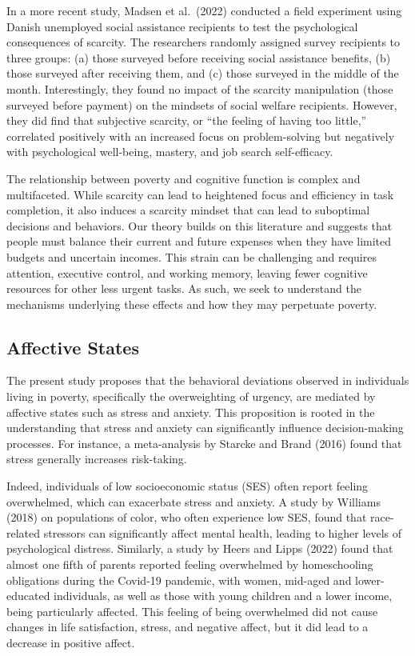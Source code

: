 \documentclass[
]{article}
\begin{document}
In a more recent study, Madsen et al.~(2022) conducted a field
experiment using Danish unemployed social assistance recipients to test
the psychological consequences of scarcity. The researchers randomly
assigned survey recipients to three groups: (a) those surveyed before
receiving social assistance benefits, (b) those surveyed after receiving
them, and (c) those surveyed in the middle of the month. Interestingly,
they found no impact of the scarcity manipulation (those surveyed before
payment) on the mindsets of social welfare recipients. However, they did
find that subjective scarcity, or ``the feeling of having too little,''
correlated positively with an increased focus on problem-solving but
negatively with psychological well-being, mastery, and job search
self-efficacy.

The relationship between poverty and cognitive function is complex and
multifaceted. While scarcity can lead to heightened focus and efficiency
in task completion, it also induces a scarcity mindset that can lead to
suboptimal decisions and behaviors. Our theory builds on this literature
and suggests that people must balance their current and future expenses
when they have limited budgets and uncertain incomes. This strain can be
challenging and requires attention, executive control, and working
memory, leaving fewer cognitive resources for other less urgent tasks.
As such, we seek to understand the mechanisms underlying these effects
and how they may perpetuate poverty.

\hypertarget{affective-states}{%
\subsection{Affective States}\label{affective-states}}

The present study proposes that the behavioral deviations observed in
individuals living in poverty, specifically the overweighting of
urgency, are mediated by affective states such as stress and anxiety.
This proposition is rooted in the understanding that stress and anxiety
can significantly influence decision-making processes. For instance, a
meta-analysis by Starcke and Brand (2016) found that stress generally
increases risk-taking.

Indeed, individuals of low socioeconomic status (SES) often report
feeling overwhelmed, which can exacerbate stress and anxiety. A study by
Williams (2018) on populations of color, who often experience low SES,
found that race-related stressors can significantly affect mental
health, leading to higher levels of psychological distress. Similarly, a
study by Heers and Lipps (2022) found that almost one fifth of parents
reported feeling overwhelmed by homeschooling obligations during the
Covid-19 pandemic, with women, mid-aged and lower-educated individuals,
as well as those with young children and a lower income, being
particularly affected. This feeling of being overwhelmed did not cause
changes in life satisfaction, stress, and negative affect, but it did
lead to a decrease in positive affect.
\end{document}
